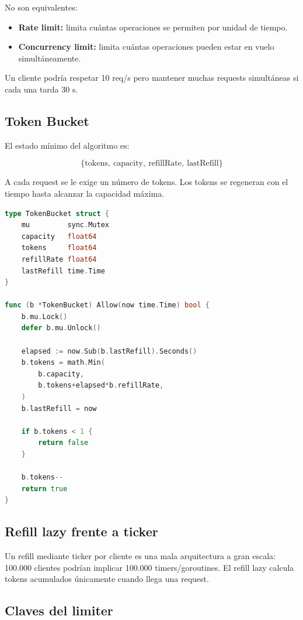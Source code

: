 \documentclass[11pt,a4paper]{article}
\begin{document}
No son equivalentes:

\begin{itemize}
  \item \textbf{Rate limit:} limita cuántas operaciones se permiten por unidad de tiempo.
  \item \textbf{Concurrency limit:} limita cuántas operaciones pueden estar en vuelo simultáneamente.
\end{itemize}

Un cliente podría respetar 10 req/s pero mantener muchas requests simultáneas si cada una tarda 30 s.

\subsection{Token Bucket}

El estado mínimo del algoritmo es:

\[
\{\text{tokens},\ \text{capacity},\ \text{refillRate},\ \text{lastRefill}\}
\]

A cada request se le exige un número de tokens. Los tokens se regeneran con el tiempo hasta alcanzar la capacidad máxima.

\begin{lstlisting}[language=Go,caption={Esqueleto de Token Bucket concurrente}]
type TokenBucket struct {
    mu         sync.Mutex
    capacity   float64
    tokens     float64
    refillRate float64
    lastRefill time.Time
}

func (b *TokenBucket) Allow(now time.Time) bool {
    b.mu.Lock()
    defer b.mu.Unlock()

    elapsed := now.Sub(b.lastRefill).Seconds()
    b.tokens = math.Min(
        b.capacity,
        b.tokens+elapsed*b.refillRate,
    )
    b.lastRefill = now

    if b.tokens < 1 {
        return false
    }

    b.tokens--
    return true
}
\end{lstlisting}

\subsection{Refill lazy frente a ticker}

Un refill mediante ticker por cliente es una mala arquitectura a gran escala: 100.000 clientes podrían implicar 100.000 timers/goroutines. El refill lazy calcula tokens acumulados únicamente cuando llega una request.

\subsection{Claves del limiter}
\end{document}
